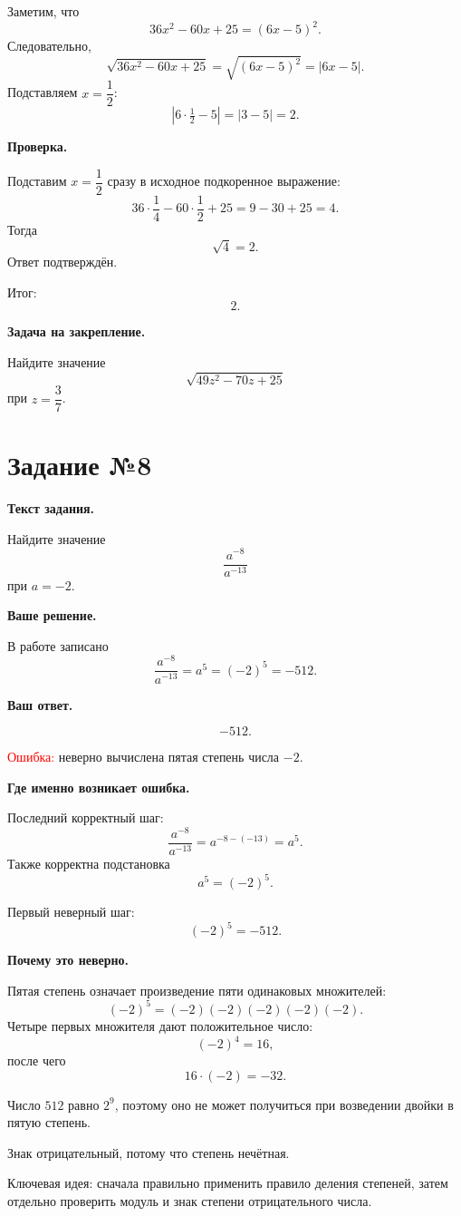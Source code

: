 \documentclass[12pt,a4paper]{article}
\begin{document}
Заметим, что
\[
36x^2-60x+25=(6x-5)^2.
\]
Следовательно,
\[
\sqrt{36x^2-60x+25}
=
\sqrt{(6x-5)^2}
=
|6x-5|.
\]
Подставляем $x=\dfrac12$:
\[
|6\cdot\tfrac12-5|
=
|3-5|
=
2.
\]

\textbf{Проверка.}

Подставим $x=\dfrac12$ сразу в исходное подкоренное выражение:
\[
36\cdot\frac14-60\cdot\frac12+25
=
9-30+25
=
4.
\]
Тогда
\[
\sqrt4=2.
\]
Ответ подтверждён.

\textcolor{teal!60!black}{Итог:}
\[
\boxed{2}.
\]

\textbf{Задача на закрепление.}

Найдите значение
\[
\sqrt{49z^2-70z+25}
\]
при $z=\dfrac37$.

\newpage
{}
\label{task:8}
\section*{Задание №8}

\textbf{Текст задания.}

Найдите значение
\[
\frac{a^{-8}}{a^{-13}}
\]
при $a=-2$.

\textbf{Ваше решение.}

В работе записано
\[
\frac{a^{-8}}{a^{-13}}
=
a^5
=
(-2)^5
=
-512.
\]

\textbf{Ваш ответ.}

\[
-512.
\]

\textcolor{red}{Ошибка:} неверно вычислена пятая степень числа $-2$.

\textbf{Где именно возникает ошибка.}

Последний корректный шаг:
\[
\frac{a^{-8}}{a^{-13}}
=
a^{-8-(-13)}
=
a^5.
\]
Также корректна подстановка
\[
a^5=(-2)^5.
\]

Первый неверный шаг:
\[
(-2)^5=-512.
\]

\textbf{Почему это неверно.}

Пятая степень означает произведение пяти одинаковых множителей:
\[
(-2)^5=(-2)(-2)(-2)(-2)(-2).
\]
Четыре первых множителя дают положительное число:
\[
(-2)^4=16,
\]
после чего
\[
16\cdot(-2)=-32.
\]

Число $512$ равно $2^9$, поэтому оно не может получиться при возведении двойки в пятую степень.

Знак отрицательный, потому что степень нечётная.

\textcolor{blue!60!black}{Ключевая идея:} сначала правильно применить правило деления степеней, затем отдельно проверить модуль и знак степени отрицательного числа.
\end{document}
